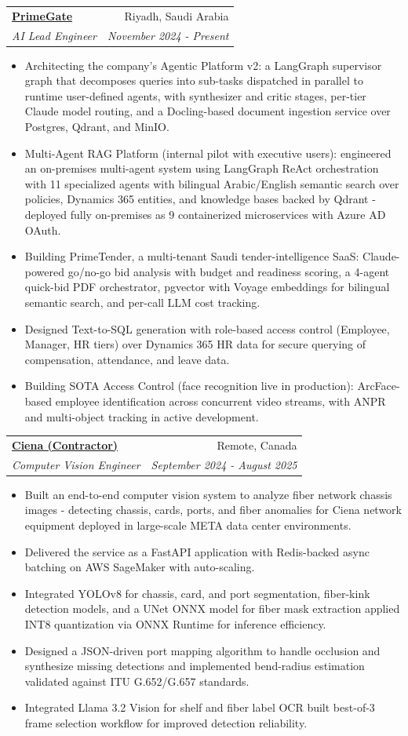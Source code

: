 \documentclass[letterpaper,11pt]{article}
\makeatletter
\newcommand{\resumeItem}[1]{
  \item\small{
    {#1 \vspace{-2pt}}
  }
}
\newcommand{\resumeSubheading}[4]{
  \vspace{-2pt}\item
    \begin{tabular*}{0.97\textwidth}[t]{l@{\extracolsep{\fill}}r}
      \textbf{#1} & #2 \\
      \textit{\small#3} & \textit{\small #4} \\
    \end{tabular*}\vspace{-7pt}
}
\newcommand{\resumeItemListStart}{\begin{itemize}}
\newcommand{\resumeItemListEnd}{\end{itemize}\vspace{-5pt}}
\makeatother
\begin{document}
    \resumeSubheading
      {\href{https://primegate.net.sa/}{PrimeGate}}{Riyadh, Saudi Arabia}
      {AI Lead Engineer}{November 2024 - Present}
      \resumeItemListStart
        \resumeItem{Architecting the company's Agentic Platform v2: a LangGraph supervisor graph that decomposes queries into sub-tasks dispatched in parallel to runtime user-defined agents, with synthesizer and critic stages, per-tier Claude model routing, and a Docling-based document ingestion service over Postgres, Qdrant, and MinIO.}
        \resumeItem{Multi-Agent RAG Platform (internal pilot with executive users): engineered an on-premises multi-agent system using LangGraph ReAct orchestration with 11 specialized agents with bilingual Arabic/English semantic search over policies, Dynamics 365 entities, and knowledge bases backed by Qdrant - deployed fully on-premises as 9 containerized microservices with Azure AD OAuth.}
        \resumeItem{Building PrimeTender, a multi-tenant Saudi tender-intelligence SaaS: Claude-powered go/no-go bid analysis with budget and readiness scoring, a 4-agent quick-bid PDF orchestrator, pgvector with Voyage embeddings for bilingual semantic search, and per-call LLM cost tracking.}
        \resumeItem{Designed Text-to-SQL generation with role-based access control (Employee, Manager, HR tiers) over Dynamics 365 HR data for secure querying of compensation, attendance, and leave data.}
        \resumeItem{Building SOTA Access Control (face recognition live in production): ArcFace-based employee identification across concurrent video streams, with ANPR and multi-object tracking in active development.}
      \resumeItemListEnd

    \resumeSubheading
      {\href{https://shorturl.at/0wlaj}{Ciena (Contractor)}}{Remote, Canada}
      {Computer Vision Engineer}{September 2024 - August 2025}
      \resumeItemListStart
        \resumeItem{Built an end-to-end computer vision system to analyze fiber network chassis images - detecting chassis, cards, ports, and fiber anomalies for Ciena network equipment deployed in large-scale META data center environments.}
        \resumeItem{Delivered the service as a FastAPI application with Redis-backed async batching on AWS SageMaker with auto-scaling.}
        \resumeItem{Integrated YOLOv8 for chassis, card, and port segmentation, fiber-kink detection models, and a UNet ONNX model for fiber mask extraction applied INT8 quantization via ONNX Runtime for inference efficiency.}
        \resumeItem{Designed a JSON-driven port mapping algorithm to handle occlusion and synthesize missing detections and implemented bend-radius estimation validated against ITU G.652/G.657 standards.}
        \resumeItem{Integrated Llama 3.2 Vision for shelf and fiber label OCR built best-of-3 frame selection workflow for improved detection reliability.}
      \resumeItemListEnd
\end{document}
